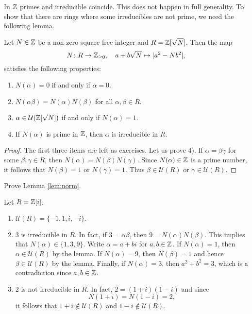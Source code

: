 In $\mathbb{Z}$ primes and irreducible coincide. 
This does not happen in full generality. 
To show that there are rings where some irreducibles are not prime, 
we need the following lemma. 

\begin{lemma}
\label{lem:norm}
Let $N\in\mathbb{Z}$ be a non-zero square-free integer and $R=\mathbb{Z}[\sqrt{N}]$. Then 
the map 
\[
	N\colon R\to\mathbb{Z}_{\geq0},
\quad a+b\sqrt{N}\mapsto 
|a^2-Nb^2|,
\]
satisfies the following properties:
\begin{enumerate}
	\item $N(\alpha)=0$ if and only if $\alpha=0$. 
	\item $N(\alpha\beta)=N(\alpha)N(\beta)$ for all $\alpha,\beta\in R$. 
	\item $\alpha\in\mathcal{U}(\mathbb{Z}[\sqrt{N}])$ if and only if $N(\alpha)=1$. 
	\item If $N(\alpha)$ is prime in $\mathbb{Z}$, then $\alpha$ is irreducible in $R$. 
\end{enumerate}	
\end{lemma}

\begin{proof}
	The first three items are left as exercises. Let us prove 4). 
	If $\alpha=\beta\gamma$ for some $\beta,\gamma\in R$, then
	$N(\alpha)=N(\beta)N(\gamma)$. Since $N(\alpha)\in\mathbb{Z}$ is a prime number, it follows that
	$N(\beta)=1$ or $N(\gamma)=1$. Thus $\beta\in\mathcal{U}(R)$ or $\gamma\in\mathcal{U}(R)$. 	
\end{proof}

\begin{exercise}
    Prove Lemma \ref{lem:norm}.
\end{exercise}

\begin{example}
	Let $R=\mathbb{Z}[i]$. 
	\begin{enumerate}
		\item $\mathcal{U}(R)=\{-1,1,i,-i\}$.
		\item $3$ is irreducible in $R$. In fact, if $3=\alpha\beta$, then
			$9=N(\alpha)N(\beta)$. This implies that $N(\alpha)\in\{1,3,9\}$. Write
			$\alpha=a+bi$ for $a,b\in\mathbb{Z}$. If $N(\alpha)=1$, then $\alpha\in\mathcal{U}(R)$ by the lemma. 
			If $N(\alpha)=9$, then $N(\beta)=1$ and hence $\beta\in\mathcal{U}(R)$ by the lemma. Finally, 
			if $N(\alpha)=3$, then $a^2+b^2=3$, which is a contradiction since $a,b\in\mathbb{Z}$. 
		\item $2$ is not irreducible in $R$. In fact, $2=(1+i)(1-i)$ and
			since \[
			N(1+i)=N(1-i)=2,
			\]
			it follows that $1+i\not\in\mathcal{U}(R)$ 
			and $1-i\not\in\mathcal{U}(R)$. 
	\end{enumerate}	
\end{example}

